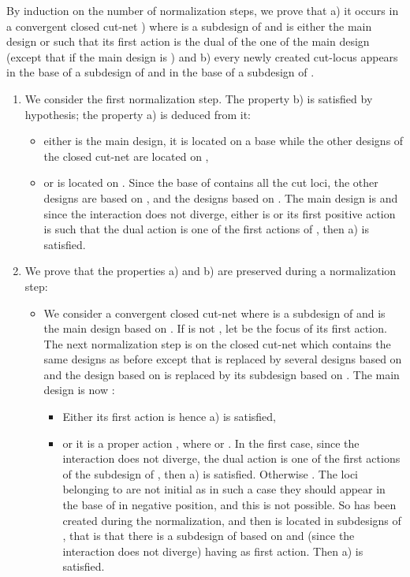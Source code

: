 \documentclass{LMCS}
\begin{document}
\proof By induction on the number of normalization steps, we prove that a) it occurs in a convergent closed cut-net  ) where  is a subdesign of  and is either the main design or such that its first action is the dual of the one of the main design (except that if the main design is ) and b)  every newly  created  cut-locus appears in the base of a subdesign of  and in the base of a subdesign of .
\begin{enumerate}
\item We consider the first normalization step. The property  b) is satisfied by hypothesis; the property a) is deduced from it:
\begin{itemize}
\item either  is the main design, it is located on a base  while the other designs of the closed cut-net are located on ,
\item or  is located on . Since the base of  contains all the cut loci, the other designs are   based on  , and the designs  based on . The main design is  and since the interaction does not diverge, either  is   or its first positive action  is such that the dual action  is one of the first actions of , then a) is satisfied.
\end{itemize}
\item We prove that the properties a) and b) are preserved during a normalization step:
\begin{itemize}
\item We consider a convergent closed cut-net  where  is a subdesign of  and is the main design based on . If  is not , let  be the focus of its first action. The next normalization step is on the closed cut-net which contains the same designs as before except that  is replaced by several designs  based on  and the design based on  is replaced by its subdesign  based on . The main design is now :
\begin{itemize}
\item Either its first action is   hence a) is satisfied, 
\item or it is a proper action , where  or . In the first case, since the interaction does not diverge, the dual action  is one of the first actions of the subdesign  of , then a) is satisfied. Otherwise . The loci belonging to  are not initial as in such a case they should appear in the base of  in negative position, and this is not possible. So  has been created during the normalization, and then is located in   subdesigns of , that is that there is a subdesign of  based on  and (since the interaction does not diverge) having  as first action. Then a) is satisfied. 

\end{itemize}
\end{itemize}
\end{enumerate}
\end{document}
